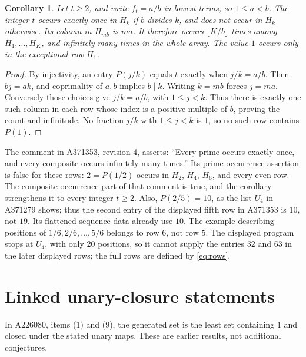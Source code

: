 \documentclass[11pt]{article}
\newtheorem{corollary}[theorem]{Corollary}
\begin{document}
\begin{corollary}\label{cor:positions}
Let $t\ge2$, and write $f_t=a/b$ in lowest terms, so $1\le a<b$.
The integer $t$ occurs exactly once in $H_k$ if $b$ divides $k$, and
does not occur in $H_k$ otherwise. Its column in $H_{mb}$ is $ma$.
It therefore occurs $\lfloor K/b\rfloor$ times among $H_1,\ldots,H_K$,
and infinitely many times in the whole array. The value $1$ occurs
only in the exceptional row $H_1$.
\end{corollary}
\begin{proof}
By injectivity, an entry $P(j/k)$ equals $t$ exactly when $j/k=a/b$.
Then $bj=ak$, and coprimality of $a,b$ implies $b\mid k$. Writing
$k=mb$ forces $j=ma$. Conversely those choices give $j/k=a/b$, with
$1\le j<k$. Thus there is exactly one such column in each row whose
index is a positive multiple of $b$, proving the count and infinitude.
No fraction $j/k$ with $1\le j<k$ is $1$, so no such row contains $P(1)$.
\end{proof}

The comment in A371353, revision 4, asserts:
``Every prime occurs exactly once, and every composite occurs infinitely many times.''
Its prime-occurrence assertion is false for
these rows: $2=P(1/2)$ occurs in $H_2$, $H_4$, $H_6$, and every even
row. The composite-occurrence part of that comment is true, and the
corollary strengthens it to every integer $t\ge2$. Also,
$P(2/5)=10$, as the list $U_4$ in A371279 shows; thus the second entry
of the displayed fifth row in A371353 is $10$, not $19$. Its flattened
sequence data already use $10$. The example describing positions of
$1/6,2/6,\ldots,5/6$ belongs to row $6$, not row $5$.
The displayed program stops at $U_4$, with only $20$ positions, so it
cannot supply the entries $32$ and $63$ in the later displayed rows;
the full rows are defined by \eqref{eq:rows}.

\section{Linked unary-closure statements}
In A226080, items (1) and (9), the generated set is the least set
containing $1$ and closed under the stated unary maps.
These are earlier results, not additional conjectures.
\end{document}
